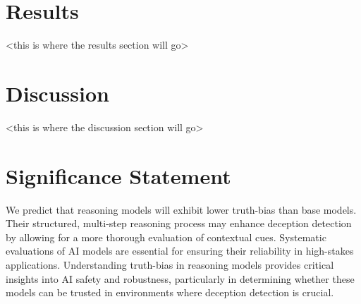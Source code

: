 \documentclass{article}
\begin{document}






\section{Results}

<this is where the results section will go>

\section{Discussion}

<this is where the discussion section will go>

\section{Significance Statement}

We predict that reasoning models will exhibit lower truth-bias than base models. Their structured, multi-step reasoning process may enhance deception detection by allowing for a more thorough evaluation of contextual cues. Systematic evaluations of AI models are essential for ensuring their reliability in high-stakes applications. Understanding truth-bias in reasoning models provides critical insights into AI safety and robustness, particularly in determining whether these models can be trusted in environments where deception detection is crucial.
\end{document}
